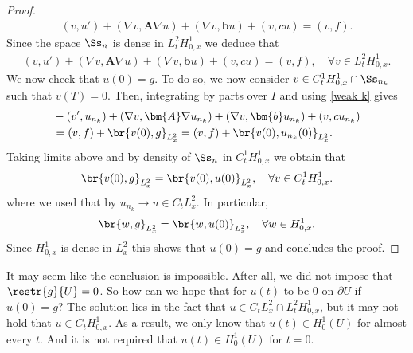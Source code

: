 \documentclass[
    a4paper,
    DIV=14,
    abstract=true,
    numbers=noenddot
]{scrartcl}
\begin{document}
\begin{proof}
  \begin{align*}
 (v, u')+ (\nabla v, \bm{A} \nabla u) + (\nabla v, \bm{b} u) + (v, cu) = (v, f).
  \end{align*}
 Since the space $\Ss _n$ is dense in $L_t^2H_{0,x}^1$ we deduce that
  \begin{align*}
 (v, u')+ (\nabla v, \bm{A} \nabla u) + (\nabla v, \bm{b} u) + (v, cu) = (v, f), \quad \forall v \in L_t^2H_{0,x}^1.
  \end{align*}
 We now check that $u(0)=g$. To do so, we now consider $v \in C^1_tH_{0,x}^1 \cap \Ss _{n_k}$ such that $v(T)=0$. Then, integrating by parts over $I$ and using \eqref{weak k} gives
  \begin{align*}
    & -(v', u_{n_k}) + (\nabla v, \bm{A} \nabla u_{n_k}) + (\nabla v, \bm{b} u_{n_k}) + (v, cu_{n_k}) \\&= (v, f)+  \br{v(0),g}_{L_x^2}=(v, f)+  \br{v(0),u_{n_k}(0)}_{L_x^2}.
  \end{align*}
 Taking limits above and by density of $\Ss_n$ in $C_t^1H_{0,x}^1$ we obtain that
  \begin{align*}
    \br{v(0),g}_{L_x^2} = \br{v(0),u(0)}_{L_x^2}, \quad \forall v \in C_t^1H_{0,x}^1.
  \end{align*}
 where we used that by  $u_{n_k} \to u \in C_t L_x^2$. In particular,
  \begin{align*}
    \br{w,g}_{L_x^2} = \br{w,u(0)}_{L_x^2}, \quad \forall w \in H_{0,x}^1.
  \end{align*}
 Since $H_{0,x}^1$ is dense in $L_x^2$ this shows that $u(0)=g$ and concludes the proof.
\end{proof}
\begin{observation}
 It may seem like the conclusion is impossible. After all, we did not impose that $\restr{g}{U}=0$. So how can we hope that for $u(t)$ to be $0$ on $\partial U$ if $u(0)=g$? The solution lies in the fact that $ u \in C_t L_{x}^2 \cap L_t^2H_{0,x}^1$, but it may not hold that $u \in C_tH_{0,x}^1$. As a result, we only know that $u(t) \in H_0^1(U)$ for almost every $t$. And it is not required that $u(t) \in H_0^1(U)$ for $t=0$. 
  \end{observation}
\end{document}
